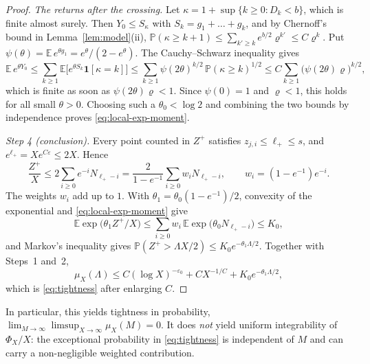 \documentclass[12pt]{amsart}
\theoremstyle{definition}
\theoremstyle{remark}
\begin{document}
\begin{proof}
\emph{The returns after the crossing.} Let
$\kappa=1+\sup\{k\ge0:D_k<b\}$, which is finite almost surely. Then
$Y_0\le S_\kappa$ with $S_k=g_1+\dots+g_k$, and by Chernoff's bound in
Lemma~\ref{lem:model}(ii),
$\mathbb P(\kappa\ge k+1)\le\sum_{k'\ge k}e^{b/2}\varrho^{k'}
\le C\varrho^{k}$. Put
$\psi(\theta)=\mathbb E\,e^{\theta g_1}=e^\theta/(2-e^\theta)$. The
Cauchy--Schwarz inequality gives
\[
 \mathbb E\,e^{\theta Y_0}
 \le\sum_{k\ge1}\mathbb E\bigl[e^{\theta S_k}\mathbf 1[\kappa=k]\bigr]
 \le\sum_{k\ge1}\psi(2\theta)^{k/2}\,\mathbb P(\kappa\ge k)^{1/2}
 \le C\sum_{k\ge1}\bigl(\psi(2\theta)\varrho\bigr)^{k/2},
\]
which is finite as soon as $\psi(2\theta)\varrho<1$. Since $\psi(0)=1$
and $\varrho<1$, this holds for all small $\theta>0$. Choosing such a
$\theta_0<\log 2$ and combining the two bounds by independence proves
\eqref{eq:local-exp-moment}.

\emph{Step 4 (conclusion).} Every point counted in $Z^+$ satisfies
$z_{j,i}\le\ell_+\le s$, and $e^{\ell_+}=Xe^{C\varepsilon}\le2X$. Hence
\[
 \frac{Z^+}{X}\le2\sum_{i\ge0}e^{-i}N_{\ell_+-i}
 =\frac{2}{1-e^{-1}}\sum_{i\ge0}w_iN_{\ell_+-i},
 \qquad w_i=(1-e^{-1})e^{-i}.
\]
The weights $w_i$ add up to $1$. With
$\theta_1=\theta_0(1-e^{-1})/2$, convexity of the exponential and
\eqref{eq:local-exp-moment} give
\[
 \mathbb E\exp\bigl(\theta_1Z^+/X\bigr)
 \le\sum_{i\ge0}w_i\,\mathbb E\exp\bigl(\theta_0N_{\ell_+-i}\bigr)\le K_0,
\]
and Markov's inequality gives
$\mathbb P(Z^+>\Lambda X/2)\le K_0e^{-\theta_1\Lambda/2}$.
Together with Steps~1 and~2,
\[
 \mu_X(\Lambda)\le C(\log X)^{-\varepsilon_0}+CX^{-1/C}
   +K_0e^{-\theta_1\Lambda/2},
\]
which is \eqref{eq:tightness} after enlarging $C$.
\end{proof}

\noindent
In particular, this yields tightness in probability,
$\lim_{M\to\infty}\limsup_{X\to\infty}\mu_X(M)=0$.
It does \emph{not} yield uniform integrability of $\Phi_X/X$:
the exceptional probability in \eqref{eq:tightness} is independent
of $M$ and can carry a non-negligible weighted contribution.
\end{document}
